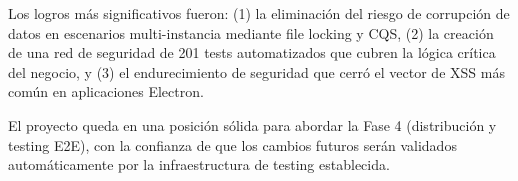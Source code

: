 \documentclass[12pt,a4paper]{article}
\begin{document}
Los logros m\'as significativos fueron: (1) la eliminaci\'on del riesgo de corrupci\'on de datos en escenarios multi-instancia mediante file locking y CQS, (2) la creaci\'on de una red de seguridad de 201 tests automatizados que cubren la l\'ogica cr\'itica del negocio, y (3) el endurecimiento de seguridad que cerr\'o el vector de XSS m\'as com\'un en aplicaciones Electron.

El proyecto queda en una posici\'on s\'olida para abordar la Fase 4 (distribuci\'on y testing E2E), con la confianza de que los cambios futuros ser\'an validados autom\'aticamente por la infraestructura de testing establecida.
\end{document}
